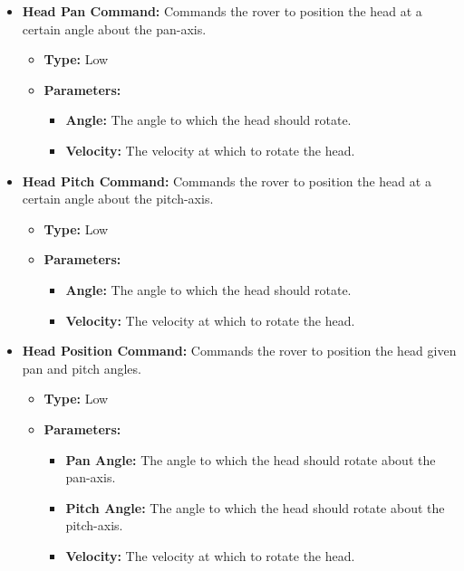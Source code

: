 \begin{itemize}
          \item \textbf{Head Pan Command:} Commands the rover to position the head at a certain angle about the pan-axis.
          \begin{itemize}
            \item \textbf{Type:} Low
            \item \textbf{Parameters:}
            \begin{itemize}
              \item \textbf{Angle:} The angle to which the head should rotate.
              \item \textbf{Velocity:} The velocity at which to rotate the head.
            \end{itemize}
          \end{itemize}
          
          \item \textbf{Head Pitch Command:} Commands the rover to position the head at a certain angle about the pitch-axis.
          \begin{itemize}
            \item \textbf{Type:} Low
            \item \textbf{Parameters:}
            \begin{itemize}
              \item \textbf{Angle:} The angle to which the head should rotate.
              \item \textbf{Velocity:} The velocity at which to rotate the head.
            \end{itemize}
          \end{itemize}
          
          \item \textbf{Head Position Command:} Commands the rover to position the head given pan and pitch angles.
          \begin{itemize}
            \item \textbf{Type:} Low
            \item \textbf{Parameters:}
            \begin{itemize}
              \item \textbf{Pan Angle:} The angle to which the head should rotate about the pan-axis.
              \item \textbf{Pitch Angle:} The angle to which the head should rotate about the pitch-axis.
              \item \textbf{Velocity:} The velocity at which to rotate the head.
            \end{itemize}
          \end{itemize}
        \end{itemize}
        
